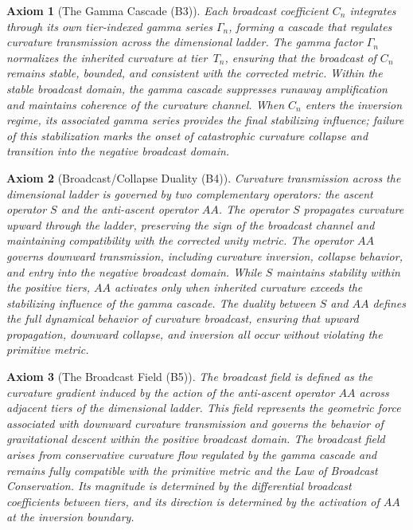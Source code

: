 \documentclass[final,onefignum,onetabnum]{siamart}
\newtheorem{axiom}{Axiom}
\begin{document}
\begin{axiom}[The Gamma Cascade (B3)]
Each broadcast coefficient $C_n$ integrates through its own tier‑indexed gamma series $\Gamma_n$, forming a cascade that regulates curvature transmission across the dimensional ladder. The gamma factor $\Gamma_n$ normalizes the inherited curvature at tier~$T_n$, ensuring that the broadcast of $C_n$ remains stable, bounded, and consistent with the corrected metric. Within the stable broadcast domain, the gamma cascade suppresses runaway amplification and maintains coherence of the curvature channel. When $C_n$ enters the inversion regime, its associated gamma series provides the final stabilizing influence; failure of this stabilization marks the onset of catastrophic curvature collapse and transition into the negative broadcast domain.
\end{axiom}

\begin{axiom}[Broadcast/Collapse Duality (B4)]
Curvature transmission across the dimensional ladder is governed by two complementary operators: the ascent operator $S$ and the anti-ascent operator $AA$. The operator $S$ propagates curvature upward through the ladder, preserving the sign of the broadcast channel and maintaining compatibility with the corrected unity metric. The operator $AA$ governs downward transmission, including curvature inversion, collapse behavior, and entry into the negative broadcast domain. While $S$ maintains stability within the positive tiers, $AA$ activates only when inherited curvature exceeds the stabilizing influence of the gamma cascade. The duality between $S$ and $AA$ defines the full dynamical behavior of curvature broadcast, ensuring that upward propagation, downward collapse, and inversion all occur without violating the primitive metric.
\end{axiom}

\begin{axiom}[The Broadcast Field (B5)]
The broadcast field is defined as the curvature gradient induced by the action of the anti-ascent operator $AA$ across adjacent tiers of the dimensional ladder. This field represents the geometric force associated with downward curvature transmission and governs the behavior of gravitational descent within the positive broadcast domain. The broadcast field arises from conservative curvature flow regulated by the gamma cascade and remains fully compatible with the primitive metric and the Law of Broadcast Conservation. Its magnitude is determined by the differential broadcast coefficients between tiers, and its direction is determined by the activation of $AA$ at the inversion boundary.
\end{axiom}
\end{document}
